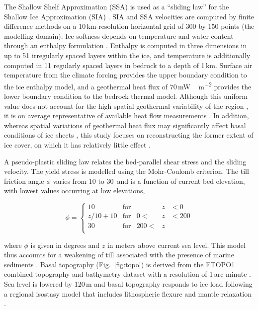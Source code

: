 The Shallow Shelf Approximation (SSA) is used as a ``sliding law'' for the Shallow Ice Approximation (SIA) \citep{bueler-brown-2009,winkelmann-etal-2011}. SIA and SSA velocities are computed by finite difference methods on a 10\,km-resolution horizontal grid of 300 by 150 points (the modelling domain). Ice softness depends on temperature and water content through an enthalpy formulation \citep{aschwanden-blatter-2009,aschwanden-etal-2012}. Enthalpy is computed in three dimensions in up to 51 irregularly spaced layers within the ice, and temperature is additionally computed in 11 regularly spaced layers in bedrock to a depth of 1\,km. Surface air temperature from the climate forcing provides the upper boundary condition to the ice enthalpy model, and a geothermal heat flux of 70\,\unit{mW\,m^{-2}} provides the lower boundary condition to the bedrock thermal model. Although this uniform value does not account for the high spatial geothermal variability of the region \citep{blackwell-richards-2004}, it is on average representative of available heat flow measurements \citep{artemieva-mooney-2001,blackwell-richards-2004}. In addition, whereas spatial variations of geothermal heat flux may significantly affect basal conditions of ice sheets \citep{pattyn-2010}, this study focuses on reconstructing the former extent of ice cover, on which it has relatively little effect \citep{rogozhina-etal-2012}.

A pseudo-plastic sliding law \citep{aschwanden-etal-2013} relates the bed-parallel shear stress and the sliding velocity. The yield stress is modelled using the Mohr-Coulomb criterion. The till friction angle $\phi$ varies from 10 to 30\degree\ and is a function of current bed elevation, with lowest values occurring at low elevations,

\begin{equation}
	\phi = \left\{\begin{array}{llrll}
		10      & \mathrm{for} &      &z&<  0 \\
		z/10+10 & \mathrm{for} &   0 <&z&<200 \\
		30      & \mathrm{for} & 200 <&z&     \\
	\end{array}\right.
\end{equation}

where $\phi$ is given in degrees and $z$ in meters above current sea level. This model thus accounts for a weakening of till associated with the presence of marine sediments \citep{martin-etal-2011,aschwanden-etal-2013}. Basal topography (Fig.~\ref{fig:topo}) is derived from the ETOPO1 combined topography and bathymetry dataset with a resolution of 1\,arc-minute \citep{data:etopo1}. Sea level is lowered by 120\,m and basal topography responds to ice load following a regional isostasy model that includes lithospheric flexure and mantle relaxation \citep{lingle-clark-1985}.

